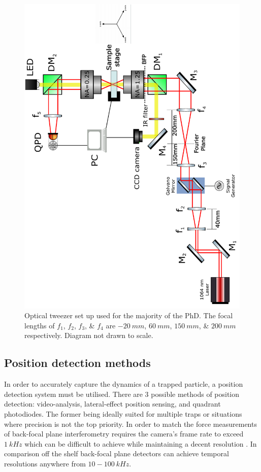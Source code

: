 \begin{figure}
	\label{fig:setup}
	\centering
	\includegraphics[height=\linewidth, angle=270]{tweezer_setup.pdf}
	\caption{Optical tweezer set up used for the majority of the PhD. The focal lengths of $f_1$, $f_2$, $f_3$, \& $f_4$ are $-20\ mm$, $60\ mm$, $150\ mm$, \& $200\ mm$ respectively. Diagram not drawn to scale.}
\end{figure}

\subsection{Position detection methods}
In order to accurately capture the dynamics of a trapped particle, 
a position detection system must be utilised. There are 3 possible
methods of position detection: video-analysis, lateral-effect
position sensing, and quadrant photodiodes. The former being 
ideally suited for multiple traps or situations where precision
is not the top priority. In order to match the force measurements
of back-focal plane interferometry requires the camera's frame
rate to exceed $1\ kHz$ which can be difficult to achieve while 
maintaining a decent resolution \cite{Gibson2008}. In comparison
off the shelf back-focal plane detectors can achieve temporal
resolutions anywhere from $10-100\ kHz$. 
 
